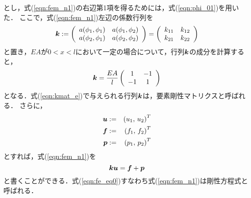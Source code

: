 \documentclass[10pt,a4j]{jarticle}
\begin{document}
とし，式(\ref{eqn:fem_n1})の右辺第1項を得るためには，式(\ref{eqn:phi_01})を用いた．
ここで，式(\ref{eqn:fem_n1})左辺の係数行列を
\begin{equation}
	\mbox{\boldmath $k$}:=
	\left(
	\begin{array}{cc}
		a(\phi_1,\phi_1) & a(\phi_1,\phi_2)  \\
		a(\phi_2,\phi_1) & a(\phi_2,\phi_2)  
	\end{array}
	\right)
	=
	\left(
	\begin{array}{cc}
		k_{11} & k_{12}  \\
		k_{21} & k_{22}  
	\end{array}
	\right)
	\label{eqn:kmat_e}
\end{equation}
と置き，$EA$が$0<x<l$において一定の場合について，行列$\mbox{\boldmath $k$}$の成分を計算すると，
\begin{equation}
	\mbox{\boldmath $k$}=
	\frac{EA}{l}
	\left(
	\begin{array}{cc}
		1 & -1  \\
		-1 & 1  
	\end{array}
	\right)
\end{equation}
となる．式(\ref{eqn:kmat_e})で与えられる行列$\mbox{\boldmath $k$}$は，要素剛性マトリクスと呼ばれる．
さらに，
\begin{eqnarray}
	\mbox{\boldmath $u$} &:= & \left( u_1,\,u_2\right)^T 
	\label{eqn:def_uvec}
	\\
	\mbox{\boldmath $f$} &:= & \left( f_1,\,f_2\right)^T 
	\label{eqn:def_fvec}
	\\
	\mbox{\boldmath $p$} &:= & \left( p_1,\,p_2\right)^T 
	\label{eqn:def_pvec}
\end{eqnarray}
とすれば，式(\ref{eqn:fem_n1})を
\begin{equation}
	\mbox{\boldmath $k$}\mbox{\boldmath $u$}=\mbox{\boldmath $f$}+\mbox{\boldmath $p$}
	\label{eqn:fe_eq0}
\end{equation}
と書くことができる．式(\ref{eqn:fe_eq0})すなわち式(\ref{eqn:fem_n1})は剛性方程式と呼ばれる．
\end{document}
